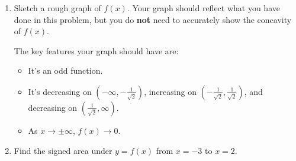 \documentclass{article}
\begin{document}
\begin{enumerate}
\begin{enumerate}
  \item
    \begin{problem}[\vfill]
      Sketch a rough graph of $f(x)$.  Your graph should reflect what you
      have done in this problem, but you do \textbf{not} need to
      accurately show the concavity of $f(x)$. 
    \end{problem}

    \begin{solution}
      \begin{center}
      \end{center}
    \end{solution}

    \begin{grading}
      The key features your graph should have are:
      \begin{itemize}
      \item It's an odd function.
      \item It's decreasing on $\left(-\infty, - \frac{1}{\sqrt{2}}
        \right)$, increasing on $\left( - \frac{1}{\sqrt{2}},
          \frac{1}{\sqrt{2}} \right)$, and decreasing on $\left(
          \frac{1}{\sqrt{2}}, \infty \right)$.
      \item As $x \to \pm \infty$, $f(x) \to 0$.
      \end{itemize}
    \end{grading}

  \item
    \begin{problem}[\vfill\newpage]
      Find the signed area under $y = f(x)$ from $x = -3$ to $x = 2$.
    \end{problem}


\end{enumerate}
\end{enumerate}
\end{document}
